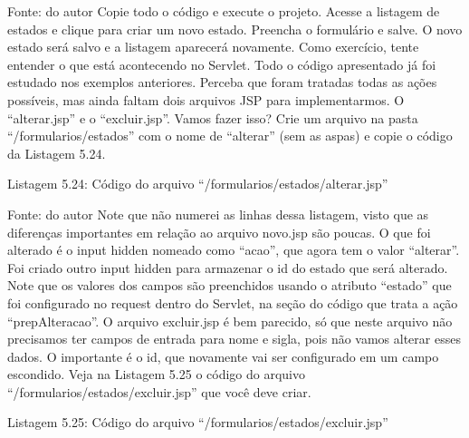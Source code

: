 Fonte: do autor
Copie todo o código e execute o projeto. Acesse a listagem de estados e clique para criar um novo estado. Preencha o formulário e salve. O novo estado será salvo e a listagem aparecerá novamente. Como exercício, tente entender o que está acontecendo no Servlet. Todo o código apresentado já foi estudado nos exemplos anteriores. Perceba que foram tratadas todas as ações possíveis, mas ainda faltam dois arquivos JSP para implementarmos. O “alterar.jsp” e o “excluir.jsp”. Vamos fazer isso? Crie um arquivo na pasta “/formularios/estados” com o nome de “alterar” (sem as aspas) e copie o código da Listagem 5.24.

























Listagem 5.24: Código do arquivo “/formularios/estados/alterar.jsp”
 
Fonte: do autor
Note que não numerei as linhas dessa listagem, visto que as diferenças importantes em relação ao arquivo novo.jsp são poucas. O que foi alterado é o input hidden nomeado como “acao”, que agora tem o valor “alterar”. Foi criado outro input hidden para armazenar o id do estado que será alterado. Note que os valores dos campos são preenchidos usando o atributo “estado” que foi configurado no request dentro do Servlet, na seção do código que trata a ação “prepAlteracao”.
O arquivo excluir.jsp é bem parecido, só que neste arquivo não precisamos ter campos de entrada para nome e sigla, pois não vamos alterar esses dados. O importante é o id, que novamente vai ser configurado em um campo escondido. Veja na Listagem 5.25 o código do arquivo “/formularios/estados/excluir.jsp” que você deve criar.




















Listagem 5.25: Código do arquivo “/formularios/estados/excluir.jsp”
 
